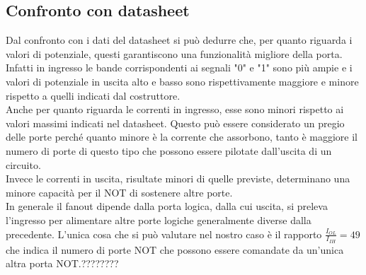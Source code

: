 \subsection{Confronto con datasheet}
Dal confronto con i dati del datasheet si può dedurre che, per quanto riguarda i valori di potenziale, questi garantiscono una funzionalità migliore della porta. Infatti in ingresso le bande corrispondenti ai segnali "0" e "1" sono più ampie e i valori di potenziale in uscita alto e basso sono rispettivamente maggiore e minore rispetto a quelli indicati dal costruttore.\\
Anche per quanto riguarda le correnti in ingresso, esse sono minori rispetto ai valori massimi indicati nel datasheet. Questo può essere considerato un pregio delle porte perché quanto minore è la corrente che assorbono, tanto è maggiore il numero di porte di questo tipo che possono essere pilotate dall'uscita di un circuito.\\
Invece le correnti in uscita, risultate minori di quelle previste, determinano una minore capacità per il NOT di sostenere altre porte.\\
In generale il fanout dipende dalla porta logica, dalla cui uscita, si preleva l'ingresso per alimentare altre porte logiche generalmente diverse dalla precedente. L'unica cosa che si può valutare nel nostro caso è il rapporto $\frac{I_{OL}}{I_{IH}}= 49$ che indica il numero di porte NOT che possono essere comandate da un'unica altra porta NOT.????????